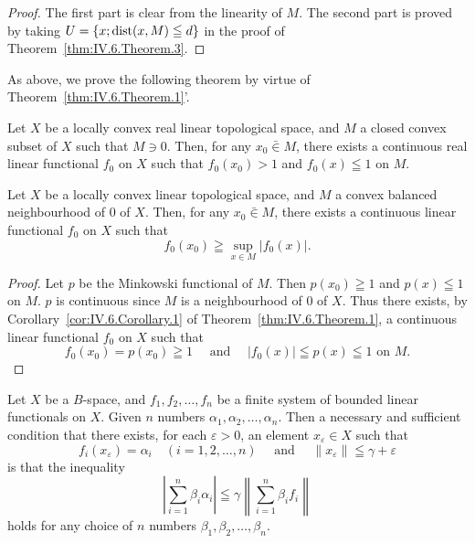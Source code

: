 \begin{proof}
 The first part is clear from the linearity of $M$. The second part is proved by taking $U=\{x;\operatorname{dist}(x,M)\leqq d\}$ in the proof of Theorem~\ref{thm:IV.6.Theorem.3}. 
\end{proof}

\begin{remarku} As above, we prove the following theorem by virtue of Theorem~\ref{thm:IV.6.Theorem.1}'. 
\end{remarku}

\begin{theoremn}\label{thm:IV.6.Theorem.3prime} Let $X$ be a locally convex real linear topological space, and $M$ a closed convex subset of $X$ such that $M \ni 0$. Then, for any $x_0 \bar{\in} M$, there exists a continuous real linear functional $f_0$ on $X$ such that $f_0(x_0) > 1$ and $f_0(x) \leqq 1$ on $M$.
\end{theoremn}

\begin{theorem}\label{thm:IV.6.Theorem.4} Let $X$ be a locally convex linear topological space, and $M$ a convex balanced neighbourhood of $0$ of $X$. Then, for any $x_{0} \bar{\in} M$, there exists a continuous linear functional $f_{0}$ on $X$ such that 
\[
f _{0} (x _{0}) \geqq \sup\limits _{x \in M} | f _{0} (x) |.
\]
\end{theorem}

\begin{proof}
 Let $p$ be the Minkowski functional of $M$. Then $p(x_0) \geqq 1$ and $p(x) \leqq 1$ on $M$. $p$ is continuous since $M$ is a neighbourhood of $0$ of $X$. Thus there exists, by Corollary~\ref{cor:IV.6.Corollary.1} of Theorem~\ref{thm:IV.6.Theorem.1}, a continuous linear functional $f_0$ on $X$ such that 
\[
f _{0} (x _{0}) = p (x _{0}) \geqq 1 \quad \text{ and } \quad | f _{0} (x) | \leqq p (x) \leqq 1 \text{ on } M. \]
\end{proof}

\begin{theorem}\label{thm:IV.6.Theorem.5} Let $X$ be a $B$-space, and $f_{1}, f_{2}, \ldots, f_{n}$ be a finite system of bounded linear functionals on $X$. Given $n$ numbers $\alpha_{1}, \alpha_{2}, \ldots, \alpha_{n}$. Then a necessary and sufficient condition that there exists, for each $\varepsilon > 0$, an element $x_{\varepsilon} \in X$ such that 
\[
f _{i} (x _{\varepsilon}) = \alpha_{i} \quad (i = 1, 2, \dots , n) \quad \text{ and } \quad \| x _{\varepsilon} \| \leqq \gamma + \varepsilon
\]
is that the inequality 
\[
\left| \sum\limits_{i=1} ^{n} \beta_{i} \alpha_{i} \right| \leqq \gamma \left\| \sum\limits_{i=1} ^{n} \beta_{i} f _{i} \right\|
\]
holds for any choice of $n$ numbers $\beta_1, \beta_2, \ldots, \beta_n$. 
\end{theorem}

